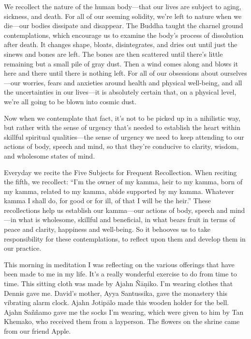 We recollect the nature of the human body---that our lives are subject 
to aging, sickness, and death. For all of our seeming solidity, we're 
left to nature when we die---our bodies dissipate and disappear. The 
Buddha taught the charnel ground contemplations, which encourage us to 
examine the body's process of dissolution after death. It changes 
shape, bloats, disintegrates, and dries out until just the sinews and 
bones are left. The bones are then scattered until there's little 
remaining but a small pile of gray dust. Then a wind comes along and 
blows it here and there until there is nothing left. For all of our 
obsessions about ourselves---our worries, fears and anxieties around 
health and physical well-being, and all the uncertainties in our 
lives---it is absolutely certain that, on a physical level, we're all 
going to be blown into cosmic dust.

Now when we contemplate that fact, it's not to be picked up in a 
nihilistic way, but rather with the sense of urgency that's needed to 
establish the heart within skillful spiritual qualities---the sense of 
urgency we need to keep attending to our actions of body, speech and 
mind, so that they're conducive to clarity, wisdom, and wholesome 
states of mind.

Everyday we recite the Five Subjects for Frequent Recollection. When 
reciting the fifth, we recollect: ``I'm the owner of my kamma, heir to 
my kamma, born of my kamma, related to my kamma, abide supported by my 
kamma. Whatever kamma I shall do, for good or for ill, of that I will 
be the heir.'' These recollections help us establish our kamma---our 
actions of body, speech and mind---in what is wholesome, skillful and 
beneficial, in what bears fruit in terms of peace and clarity, 
happiness and well-being. So it behooves us to take responsibility for 
these contemplations, to reflect upon them and develop them in our 
practice.


This morning in meditation I was reflecting on the various offerings 
that have been made to me in my life. It's a really wonderful exercise 
to do from time to time. This sitting cloth was made by Ajahn 
Ñāṇiko. I'm wearing clothes that Dennis gave me. David's mother, 
Ayya Santussika, gave the monastery this vibrating alarm clock. Ajahn 
Jotipālo made this wooden holder for the bell. Ajahn Saññamo gave me 
the socks I'm wearing, which were given to him by Tan Khemako, who 
received them from a layperson. The flowers on the shrine came from our 
friend Apple.


